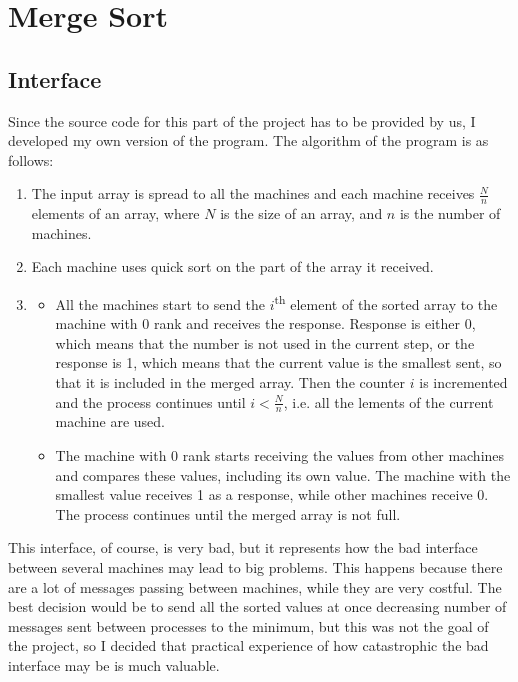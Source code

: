 \documentclass{article}
\begin{document}
	
\section{Merge Sort}

	\subsection{Interface}
		Since the source code for this part of the project has to be provided by us, I developed my own version of the program. The algorithm of the program is as follows:
		\begin{enumerate}
			\item The input array is spread to all the machines and each machine receives $\frac{N}{n}$ elements of an array, where $N$ is the size of an array, and $n$ is the number of machines.
			\item Each machine uses quick sort on the part of the array it received.
			\item 
				\begin{itemize}
					\item All the machines start to send the $i$\textsuperscript{th} element of the sorted array to the machine with 0 rank and receives the response. Response is either 0, which means that the number is not used in the current step, or the response is 1, which means that the current value is the smallest sent, so that it is included in the merged array. Then the counter $i$ is incremented and the process continues until $i < \frac{N}{n}$, i.e. all the lements of the current machine are used.
					\item The machine with 0 rank starts receiving the values from other machines and compares these values, including its own value. The machine with the smallest value receives 1 as a response, while other machines receive 0. The process continues until the merged array is not full.
				\end{itemize}							
		\end{enumerate}
		
		This interface, of course, is very bad, but it represents how the bad interface between several machines may lead to big problems. This happens because there are a lot of messages passing between machines, while they are very costful. The best decision would be to send all the sorted values at once decreasing number of messages sent between processes to the minimum, but this was not the goal of the project, so I decided that practical experience of how catastrophic the bad interface may be is much valuable.
		
\end{document}
